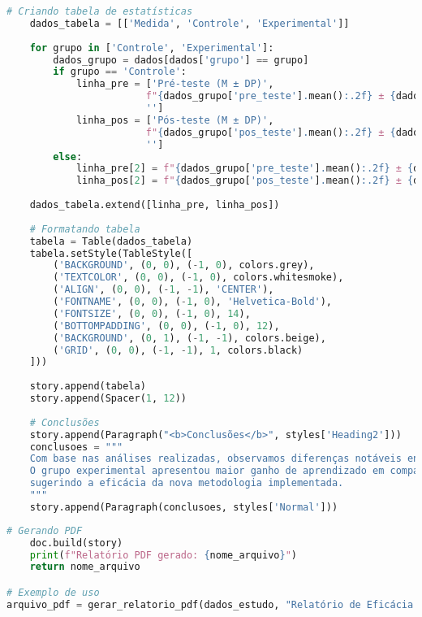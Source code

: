 \begin{pythonbox}
\begin{lstlisting}[language=Python]       
    # Criando tabela de estatísticas
    dados_tabela = [['Medida', 'Controle', 'Experimental']]
    
    for grupo in ['Controle', 'Experimental']:
        dados_grupo = dados[dados['grupo'] == grupo]
        if grupo == 'Controle':
            linha_pre = ['Pré-teste (M ± DP)', 
                        f"{dados_grupo['pre_teste'].mean():.2f} ± {dados_grupo['pre_teste'].std():.2f}",
                        '']
            linha_pos = ['Pós-teste (M ± DP)', 
                        f"{dados_grupo['pos_teste'].mean():.2f} ± {dados_grupo['pos_teste'].std():.2f}",
                        '']
        else:
            linha_pre[2] = f"{dados_grupo['pre_teste'].mean():.2f} ± {dados_grupo['pre_teste'].std():.2f}"
            linha_pos[2] = f"{dados_grupo['pos_teste'].mean():.2f} ± {dados_grupo['pos_teste'].std():.2f}"
    
    dados_tabela.extend([linha_pre, linha_pos])
    
    # Formatando tabela
    tabela = Table(dados_tabela)
    tabela.setStyle(TableStyle([
        ('BACKGROUND', (0, 0), (-1, 0), colors.grey),
        ('TEXTCOLOR', (0, 0), (-1, 0), colors.whitesmoke),
        ('ALIGN', (0, 0), (-1, -1), 'CENTER'),
        ('FONTNAME', (0, 0), (-1, 0), 'Helvetica-Bold'),
        ('FONTSIZE', (0, 0), (-1, 0), 14),
        ('BOTTOMPADDING', (0, 0), (-1, 0), 12),
        ('BACKGROUND', (0, 1), (-1, -1), colors.beige),
        ('GRID', (0, 0), (-1, -1), 1, colors.black)
    ]))
    
    story.append(tabela)
    story.append(Spacer(1, 12))
    
    # Conclusões
    story.append(Paragraph("<b>Conclusões</b>", styles['Heading2']))
    conclusoes = """
    Com base nas análises realizadas, observamos diferenças notáveis entre os grupos controle e experimental. 
    O grupo experimental apresentou maior ganho de aprendizado em comparação ao grupo controle, 
    sugerindo a eficácia da nova metodologia implementada.
    """
    story.append(Paragraph(conclusoes, styles['Normal']))
       \end{lstlisting}
\end{pythonbox}

\begin{pythonbox}
\begin{lstlisting}[language=Python]       
    # Gerando PDF
    doc.build(story)
    print(f"Relatório PDF gerado: {nome_arquivo}")
    return nome_arquivo

# Exemplo de uso
arquivo_pdf = gerar_relatorio_pdf(dados_estudo, "Relatório de Eficácia Educacional")
\end{lstlisting}
\end{pythonbox}

